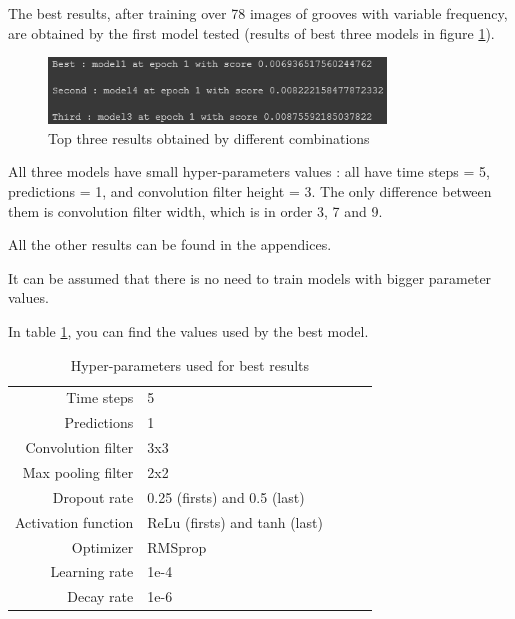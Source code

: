 \documentclass[12pt, twoside]{article}
\begin{document}
The best results, after training over 78 images of grooves with variable frequency, are obtained by the first model tested (results of best three models in figure \ref{resp1v4}).

\begin{figure}
	\centering
	\includegraphics[width=0.8\textwidth]{../images/resp1v4.png}
	\caption{Top three results obtained by different combinations}
	\label{resp1v4}
\end{figure}

All three models have small hyper-parameters values : all have time steps = 5, predictions = 1, and convolution filter height = 3. The only difference between them is convolution filter width, which is in order 3, 7 and 9.

All the other results can be found in the appendices.

It can be assumed that there is no need to train models with bigger parameter values.

In table \ref{hpm1}, you can find the values used by the best model.

\begin{table}
	\begin{tabular}{|r|l|lll}
		\cline{1-2}
		Time steps        & 5        &  &  &  \\ \cline{1-2}
		Predictions       & 1     &  &  &  \\ \cline{1-2}
		Convolution filter    & 3x3 &  &  &  \\ \cline{1-2}
		Max pooling filter    & 2x2        &  &  &  \\ \cline{1-2}
		Dropout rate   & 0.25 (firsts) and 0.5 (last)          &  &  &  \\ \cline{1-2}
		Activation function & ReLu (firsts) and tanh (last)        &  &  &  \\ \cline{1-2}
		Optimizer & RMSprop         &  &  &  \\ \cline{1-2}
		Learning rate & 1e-4         &  &  &  \\ \cline{1-2}
		Decay rate & 1e-6         &  &  &  \\ \cline{1-2}
	\end{tabular}
	\caption{Hyper-parameters used for best results}
	\label{hpm1}
\end{table}
\end{document}
